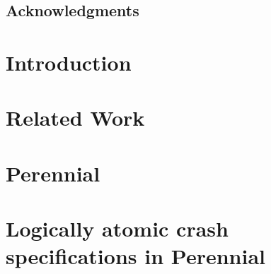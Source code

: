 \documentclass[11pt,twoside,final]{mitthesis}
\begin{document}



\maketitle

\begin{abstractpage}

\end{abstractpage}
\cleardoublepage

\section*{Acknowledgments}
  
\cleardoublepage


\tableofcontents
\clearpage
\listoffigures
\clearpage



\chapter{Introduction}%
\label{ch:introduction}


\chapter{Related Work}%
\label{ch:related}


\chapter{Perennial}%
\label{ch:perennial}


\chapter{Logically atomic crash specifications in Perennial}%
\label{ch:crash-logatom}

\end{document}
